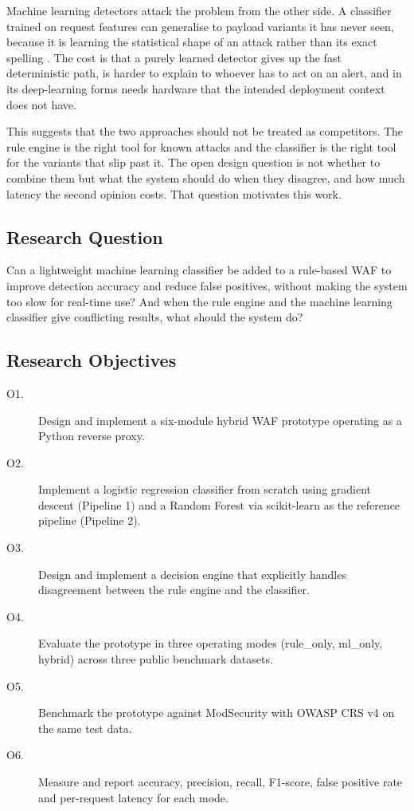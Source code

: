 \documentclass[runningheads]{llncs}
\begin{document}
Machine learning detectors attack the problem from the other side. A
classifier trained on request features can generalise to payload
variants it has never seen, because it is learning the statistical shape
of an attack rather than its exact spelling
\citep{applebaum2021,durmuskaya2025}. The cost is that a purely
learned detector gives up the fast deterministic path, is harder to
explain to whoever has to act on an alert, and in its deep-learning
forms needs hardware that the intended deployment context does not have.

This suggests that the two approaches should not be treated as
competitors. The rule engine is the right tool for known attacks and the
classifier is the right tool for the variants that slip past it. The
open design question is not whether to combine them but what the system
should do when they disagree, and how much latency the second opinion
costs. That question motivates this work.

\subsection{Research Question}

Can a lightweight machine learning classifier be added to a rule-based
WAF to improve detection accuracy and reduce false positives, without
making the system too slow for real-time use? And when the rule engine
and the machine learning classifier give conflicting results, what
should the system do?

\subsection{Research Objectives}

\begin{description}
  \item[O1.] Design and implement a six-module hybrid WAF prototype
    operating as a Python reverse proxy.
  \item[O2.] Implement a logistic regression classifier from scratch
    using gradient descent (Pipeline 1) and a Random Forest via
    scikit-learn as the reference pipeline (Pipeline 2).
  \item[O3.] Design and implement a decision engine that explicitly
    handles disagreement between the rule engine and the classifier.
  \item[O4.] Evaluate the prototype in three operating modes
    (rule\_only, ml\_only, hybrid) across three public benchmark
    datasets.
  \item[O5.] Benchmark the prototype against ModSecurity with OWASP CRS
    v4 on the same test data.
  \item[O6.] Measure and report accuracy, precision, recall, F1-score,
    false positive rate and per-request latency for each mode.
\end{description}
\end{document}
